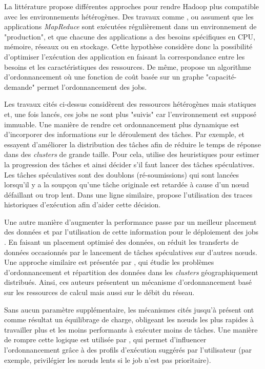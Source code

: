 La littérature propose différentes approches pour rendre Hadoop plus compatible avec les environnements hétérogènes. Des travaux comme \cite{Kumar2012}, \cite{Tian2009} ou \cite{Rasooli2012} assument que les applications \textit{MapReduce} sont exécutées régulièrement dans un environnement de "production", et que chacune des applications a des besoins spécifiques en CPU, mémoire, réseaux ou en stockage. Cette hypothèse considère donc la possibilité d'optimiser l'exécution des application en faisant la correspondance entre les besoins et les caractéristiques des ressources. De même, \cite{Isard2009} propose un algorithme d'ordonnancement où une fonction de coût basée sur un graphe "capacité-demande" permet l'ordonnancement des jobs.

Les travaux cités ci-dessus considèrent des ressources hétérogènes mais statiques et, une fois lancés, ces jobs ne sont plus "suivis" car l'environnement est supposé immuable. Une manière de rendre cet ordonnancement plus dynamique est d'incorporer des informations sur le déroulement des tâches. Par exemple, \cite{Zaharia2008} et \cite{Chen} essayent d'améliorer la distribution des tâches afin de réduire le temps de réponse dans des \textit{clusters} de grande taille. Pour cela, \cite{Zaharia2008} utilise des heuristiques pour estimer la progression des tâches et ainsi décider s'il faut lancer des tâches spéculatives. Les tâches spéculatives sont des doublons (ré-soumissions) qui sont lancées lorsqu'il y a la soupçon qu'une tâche originale est retardée à cause d'un n{\oe}ud défaillant ou trop lent. Dans une ligne similaire, \cite{Chen} propose l'utilisation des traces historiques d'exécution afin d'aider cette décision. 


Une autre manière d'augmenter la performance passe par un meilleur placement des données et par l'utilisation de cette information pour le déploiement des jobs \cite{Xie2010}. En faisant un placement optimisé des données, on réduit les transferts de données occasionnés par le lancement de tâches spéculatives sur d'autres n{\oe}uds. Une approche similaire est présentée par \cite{Cavallo2015}, qui étudie les problèmes d'ordonnancement et répartition des données dans les \textit{clusters} géographiquement distribués. Ainsi, ces auteurs présentent un mécanisme d'ordonnancement basé sur les ressources de calcul mais aussi sur le débit du réseau.  

Sans aucun paramètre supplémentaire, les mécanismes cités jusqu'à présent ont comme résultat un équilibrage de charge, obligeant les n{\oe}uds les plus rapides à travailler plus et les moins performants à exécuter moins de tâches. Une manière de rompre cette logique est utilisée par \cite{Sandholm2010},  qui permet d'influencer l'ordonnancement grâce à des profils d'exécution suggérés par l'utilisateur (par exemple, privilégier les n{\oe}uds lents si le job n'est pas prioritaire).  

